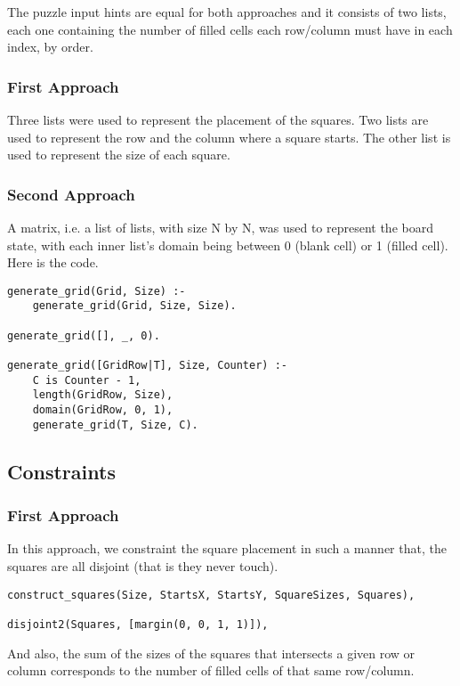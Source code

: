 \documentclass[runningheads]{llncs}
\begin{document}
The puzzle input hints are equal for both approaches and it consists of two lists, each one containing the number of filled cells each row/column must have in each index, by order.

\subsubsection{First Approach}

Three lists were used to represent the placement of the squares. Two lists are used to represent the row and the column where a square starts. The other list is used to represent the size of each square.

\subsubsection{Second Approach}

A matrix, i.e. a list of lists, with size N by N, was used to represent the board state, with each inner list's domain being between 0 (blank cell) or 1 (filled cell). Here is the code.

\begin{verbatim}
generate_grid(Grid, Size) :-
    generate_grid(Grid, Size, Size).

generate_grid([], _, 0).

generate_grid([GridRow|T], Size, Counter) :-
    C is Counter - 1,
    length(GridRow, Size),
    domain(GridRow, 0, 1),
    generate_grid(T, Size, C).
\end{verbatim}

\subsection{Constraints}

\subsubsection{First Approach}

In this approach, we constraint the square placement in such a manner that, the squares are all disjoint (that is they never touch).

\begin{verbatim}
construct_squares(Size, StartsX, StartsY, SquareSizes, Squares), 

disjoint2(Squares, [margin(0, 0, 1, 1)]),
\end{verbatim}

And also, the sum of the sizes of the squares that intersects a given row or column corresponds to the number of filled cells of that same row/column.
\end{document}
